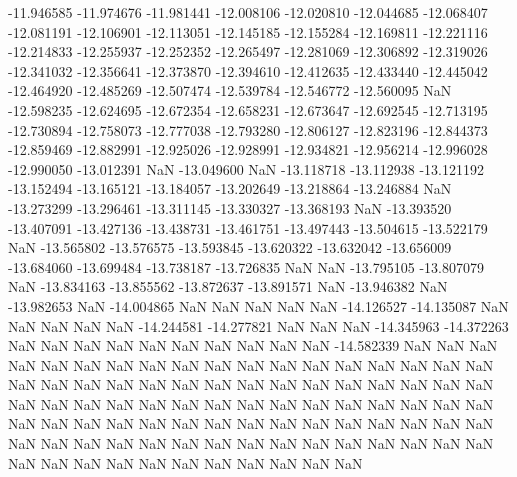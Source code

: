 -11.946585
-11.974676
-11.981441
-12.008106
-12.020810
-12.044685
-12.068407
-12.081191
-12.106901
-12.113051
-12.145185
-12.155284
-12.169811
-12.221116
-12.214833
-12.255937
-12.252352
-12.265497
-12.281069
-12.306892
-12.319026
-12.341032
-12.356641
-12.373870
-12.394610
-12.412635
-12.433440
-12.445042
-12.464920
-12.485269
-12.507474
-12.539784
-12.546772
-12.560095
NaN
-12.598235
-12.624695
-12.672354
-12.658231
-12.673647
-12.692545
-12.713195
-12.730894
-12.758073
-12.777038
-12.793280
-12.806127
-12.823196
-12.844373
-12.859469
-12.882991
-12.925026
-12.928991
-12.934821
-12.956214
-12.996028
-12.990050
-13.012391
NaN
-13.049600
NaN
-13.118718
-13.112938
-13.121192
-13.152494
-13.165121
-13.184057
-13.202649
-13.218864
-13.246884
NaN
-13.273299
-13.296461
-13.311145
-13.330327
-13.368193
NaN
-13.393520
-13.407091
-13.427136
-13.438731
-13.461751
-13.497443
-13.504615
-13.522179
NaN
-13.565802
-13.576575
-13.593845
-13.620322
-13.632042
-13.656009
-13.684060
-13.699484
-13.738187
-13.726835
NaN
NaN
-13.795105
-13.807079
NaN
-13.834163
-13.855562
-13.872637
-13.891571
NaN
-13.946382
NaN
-13.982653
NaN
-14.004865
NaN
NaN
NaN
NaN
NaN
-14.126527
-14.135087
NaN
NaN
NaN
NaN
NaN
-14.244581
-14.277821
NaN
NaN
NaN
-14.345963
-14.372263
NaN
NaN
NaN
NaN
NaN
NaN
NaN
NaN
NaN
NaN
-14.582339
NaN
NaN
NaN
NaN
NaN
NaN
NaN
NaN
NaN
NaN
NaN
NaN
NaN
NaN
NaN
NaN
NaN
NaN
NaN
NaN
NaN
NaN
NaN
NaN
NaN
NaN
NaN
NaN
NaN
NaN
NaN
NaN
NaN
NaN
NaN
NaN
NaN
NaN
NaN
NaN
NaN
NaN
NaN
NaN
NaN
NaN
NaN
NaN
NaN
NaN
NaN
NaN
NaN
NaN
NaN
NaN
NaN
NaN
NaN
NaN
NaN
NaN
NaN
NaN
NaN
NaN
NaN
NaN
NaN
NaN
NaN
NaN
NaN
NaN
NaN
NaN
NaN
NaN
NaN
NaN
NaN
NaN
NaN
NaN
NaN
NaN
NaN
NaN
NaN
